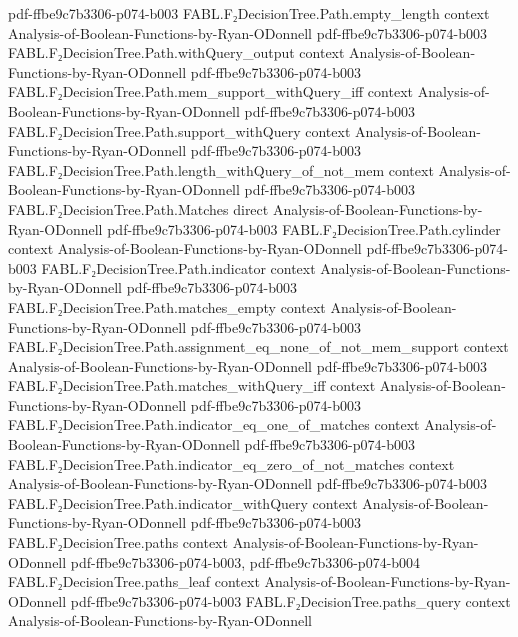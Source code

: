 \begin{theorem}
  {pdf-ffbe9c7b3306-p074-b003}
\proofstep
  {FABL.F₂DecisionTree.Path.empty_length}
  {context}
  {Analysis-of-Boolean-Functions-by-Ryan-ODonnell}
  {pdf-ffbe9c7b3306-p074-b003}
\proofstep
  {FABL.F₂DecisionTree.Path.withQuery_output}
  {context}
  {Analysis-of-Boolean-Functions-by-Ryan-ODonnell}
  {pdf-ffbe9c7b3306-p074-b003}
\proofstep
  {FABL.F₂DecisionTree.Path.mem_support_withQuery_iff}
  {context}
  {Analysis-of-Boolean-Functions-by-Ryan-ODonnell}
  {pdf-ffbe9c7b3306-p074-b003}
\proofstep
  {FABL.F₂DecisionTree.Path.support_withQuery}
  {context}
  {Analysis-of-Boolean-Functions-by-Ryan-ODonnell}
  {pdf-ffbe9c7b3306-p074-b003}
\proofstep
  {FABL.F₂DecisionTree.Path.length_withQuery_of_not_mem}
  {context}
  {Analysis-of-Boolean-Functions-by-Ryan-ODonnell}
  {pdf-ffbe9c7b3306-p074-b003}
\proofstep
  {FABL.F₂DecisionTree.Path.Matches}
  {direct}
  {Analysis-of-Boolean-Functions-by-Ryan-ODonnell}
  {pdf-ffbe9c7b3306-p074-b003}
\proofstep
  {FABL.F₂DecisionTree.Path.cylinder}
  {context}
  {Analysis-of-Boolean-Functions-by-Ryan-ODonnell}
  {pdf-ffbe9c7b3306-p074-b003}
\proofstep
  {FABL.F₂DecisionTree.Path.indicator}
  {context}
  {Analysis-of-Boolean-Functions-by-Ryan-ODonnell}
  {pdf-ffbe9c7b3306-p074-b003}
\proofstep
  {FABL.F₂DecisionTree.Path.matches_empty}
  {context}
  {Analysis-of-Boolean-Functions-by-Ryan-ODonnell}
  {pdf-ffbe9c7b3306-p074-b003}
\proofstep
  {FABL.F₂DecisionTree.Path.assignment_eq_none_of_not_mem_support}
  {context}
  {Analysis-of-Boolean-Functions-by-Ryan-ODonnell}
  {pdf-ffbe9c7b3306-p074-b003}
\proofstep
  {FABL.F₂DecisionTree.Path.matches_withQuery_iff}
  {context}
  {Analysis-of-Boolean-Functions-by-Ryan-ODonnell}
  {pdf-ffbe9c7b3306-p074-b003}
\proofstep
  {FABL.F₂DecisionTree.Path.indicator_eq_one_of_matches}
  {context}
  {Analysis-of-Boolean-Functions-by-Ryan-ODonnell}
  {pdf-ffbe9c7b3306-p074-b003}
\proofstep
  {FABL.F₂DecisionTree.Path.indicator_eq_zero_of_not_matches}
  {context}
  {Analysis-of-Boolean-Functions-by-Ryan-ODonnell}
  {pdf-ffbe9c7b3306-p074-b003}
\proofstep
  {FABL.F₂DecisionTree.Path.indicator_withQuery}
  {context}
  {Analysis-of-Boolean-Functions-by-Ryan-ODonnell}
  {pdf-ffbe9c7b3306-p074-b003}
\proofstep
  {FABL.F₂DecisionTree.paths}
  {context}
  {Analysis-of-Boolean-Functions-by-Ryan-ODonnell}
  {pdf-ffbe9c7b3306-p074-b003,
    pdf-ffbe9c7b3306-p074-b004}
\proofstep
  {FABL.F₂DecisionTree.paths_leaf}
  {context}
  {Analysis-of-Boolean-Functions-by-Ryan-ODonnell}
  {pdf-ffbe9c7b3306-p074-b003}
\proofstep
  {FABL.F₂DecisionTree.paths_query}
  {context}
  {Analysis-of-Boolean-Functions-by-Ryan-ODonnell}

\end{theorem}
